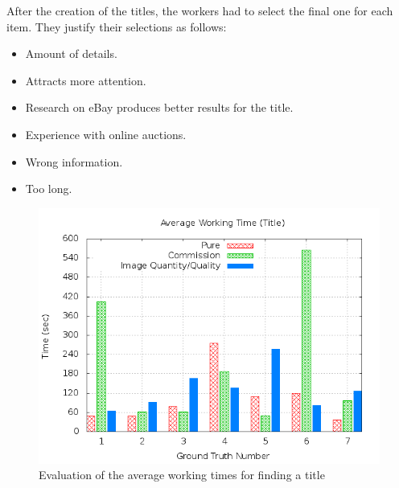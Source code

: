 After the creation of the titles, the workers had to select the final one for each item. They justify their selections as follows:
\begin{itemize}
	\item Amount of details. 
	\item Attracts more attention. 
	\item Research on eBay produces better results for the title. 
	\item Experience with online auctions. 
	\item Wrong information. 
	\item Too long. 
\end{itemize}
\begin{figure}
\centering
\includegraphics[scale=0.55]{images/plots/crowdsourcing/plot_time_title.png}
\caption{Evaluation of the average working times for finding a title}
\label{crowdsourcing_time_title}
\end{figure}
